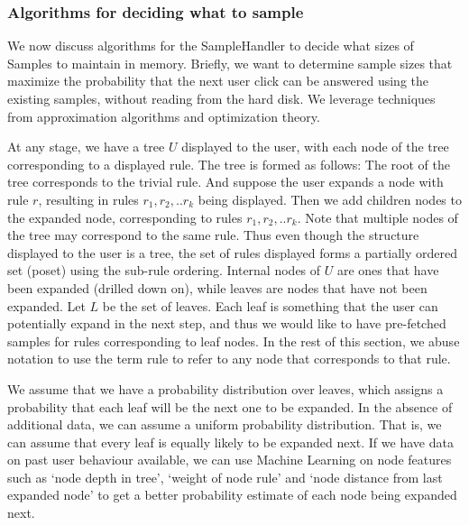 \subsubsection{Algorithms for deciding what to sample}\label{sec:sampling_algorithms}
We now discuss algorithms for the SampleHandler to decide what sizes of Samples to maintain in memory. Briefly, we want to determine sample sizes that maximize the probability that the next user click can be answered using the existing samples, without reading from the hard disk. We leverage techniques from approximation algorithms and optimization theory.

At any stage, we have a tree $U$ displayed to the user, with each node of the tree corresponding to a displayed rule. The tree is formed as follows: The root of the tree corresponds to the trivial rule. And suppose the user expands a node with rule $r$, resulting in rules $r_1, r_2, .. r_k$ being displayed. Then we add children nodes to the expanded node, corresponding to rules $r_1, r_2, .. r_k$. Note that multiple nodes of the tree may correspond to the same rule. Thus even though the structure displayed to the user is a tree, the set of rules displayed forms a partially ordered set (poset) using the sub-rule ordering. Internal nodes of $U$ are ones that have been expanded (drilled down on), while leaves are nodes that have not been expanded. Let $L$ be the set of leaves. Each leaf is something that the user can potentially expand in the next step, and thus we would like to have pre-fetched samples for rules corresponding to leaf nodes.
In the rest of this section, we abuse notation to use the term rule to refer to any node that corresponds to that rule.

We assume that we have a probability distribution over leaves, which assigns a probability that each leaf will be the next one to be expanded. In the absence of additional data, we can assume a uniform probability distribution. That is, we can assume that every leaf is equally likely to be expanded next. If we have data on past user behaviour available, we can use Machine Learning on node features such as `node depth in tree', `weight of node rule' and `node distance from last expanded node' to get a better probability estimate of each node being expanded next. 

